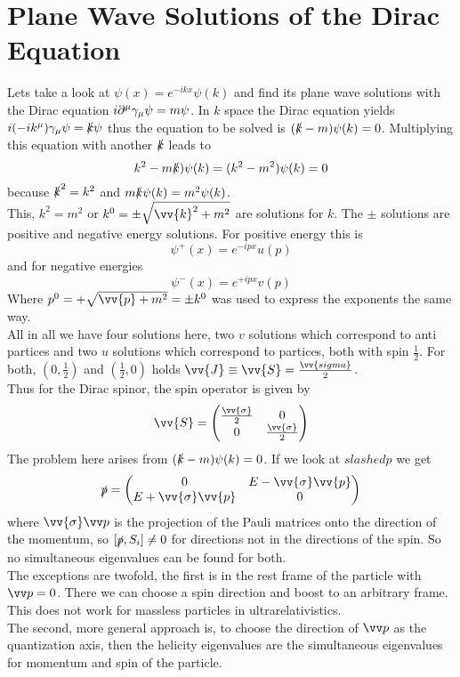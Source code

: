\section{Plane Wave Solutions of the Dirac Equation}

Lets take a look at $\psi(x) = e^{-ikx}\psi(k)$ and find its plane wave solutions with the Dirac equation $i \partial^\mu \gamma_\mu \psi = m \psi$. In $k$ space the Dirac equation yields $i (-i k^\mu) \gamma_\mu \psi = \slashed{k} \psi$ thus the equation to be solved is $(\slashed{k} - m) \psi(k) = 0$. Multiplying this equation with another $\slashed{k}$ leads to
\[ k^2 - m \slashed{k}) \psi(k) = (k^2 - m ^2) \psi(k)= 0 \]
because $\slashed{k}^2 = k^2$ and $m\slashed{k}\psi(k) = m^2 \psi(k)$.\\
This, $k^2 = m^2$ or $k^0 = \pm \sqrt{ \vv{k}^2 + m ^2}$ are solutions for $k$. The $\pm$ solutions are positive and negative energy solutions. For positive energy this is
\[\psi^+(x) = e^{-ipx}u(p)\]
and for negative energies
\[ \psi^-(x) = e^{+ipx}v(p)\]
Where $p^0 = + \sqrt{\vv{p} + m^2} = \pm k^0$ was used to express the exponents the same way.\\
All in all we have four solutions here, two $v$ solutions which correspond to anti partices and two $u$ solutions which correspond to partices, both with spin $\frac{1}{2}$. For both, $\left( 0, \frac{1}{2}\right)$ and $\left(\frac{1}{2}, 0\right)$ holds $\vv{J} \equiv \vv{S} = \frac{\vv{sigma}}{2}$.\\
Thus for the Dirac spinor, the spin operator is given by
\[ \vv{S} = \Matz{\frac{\vv{\sigma}}{2}}{0}{0}{\frac{\vv{\sigma}}{2}}\]
The problem here arises from $(\slashed{k} - m)\psi(k) = 0$. If we look at $slashed{p}$ we get
\[ \slashed{p} = \Matz{0}{E - \vv{\sigma}\vv{p}}{E + \vv{\sigma}\vv{p}}{0}\]
where $\vv{\sigma}\vp$ is the projection of the Pauli matrices onto the direction of the momentum, so $[\slashed{p}, S_i]\neq 0$ for directions not in the directions of the spin. So no simultaneous eigenvalues can be found for both.\\
The exceptions are twofold, the first is in the rest frame of the particle with $\vp = 0$. There we can choose a spin direction and boost to an arbitrary frame. This does not work for massless particles in ultrarelativistics.\\
The second, more general approach is, to choose the direction of $\vp$ as the quantization axis, then the helicity eigenvalues are the simultaneous eigenvalues for momentum and spin of the particle.\\
